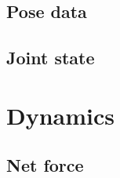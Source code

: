 \subsection{Pose data}

\subsection{Joint state}

\section{Dynamics}
\subsection{Net force}

% 

% 

% 
